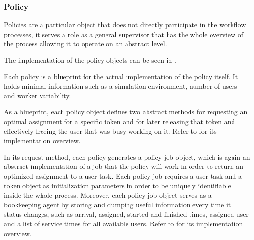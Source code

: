 \documentclass[draft=false]{seal_thesis}
\begin{document}
\subsubsection{Policy}

Policies are a particular object that does not directly participate in the workflow processes, it serves a role as a general supervisor that has the whole overview of the process allowing it to operate on an abstract level. 

The implementation of the policy objects can be seen in .


Each policy is a blueprint for the actual implementation of the policy itself. It holds minimal information such as a simulation environment, number of users and worker variability.

As a blueprint, each policy object defines two abstract methods for requesting an optimal assignment for a specific token and for later releasing that token and effectively freeing the user that was busy working on it. Refer to  for its implementation overview.


In its request method, each policy generates a policy job object, which is again an abstract implementation of a job that the policy will work in order to return an optimized assignment to a user task. Each policy job requires a user task and a token object as initialization parameters in order to be uniquely identifiable inside the whole process. Moreover, each policy job object serves as a bookkeeping agent by storing and dumping useful information every time it status changes, such as arrival, assigned, started and finished times, assigned user and a list of service times for all available users. Refer to  for its implementation overview.

\end{document}
